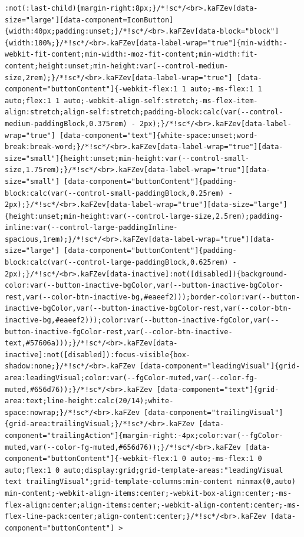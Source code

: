 \documentclass[
  letterpaper,
]{book}
\begin{document}
\begin{verbatim}
:not(:last-child){margin-right:8px;}/*!sc*/<br>.kaFZev[data-size="large"][data-component=IconButton]{width:40px;padding:unset;}/*!sc*/<br>.kaFZev[data-block="block"]{width:100%;}/*!sc*/<br>.kaFZev[data-label-wrap="true"]{min-width:-webkit-fit-content;min-width:-moz-fit-content;min-width:fit-content;height:unset;min-height:var(--control-medium-size,2rem);}/*!sc*/<br>.kaFZev[data-label-wrap="true"] [data-component="buttonContent"]{-webkit-flex:1 1 auto;-ms-flex:1 1 auto;flex:1 1 auto;-webkit-align-self:stretch;-ms-flex-item-align:stretch;align-self:stretch;padding-block:calc(var(--control-medium-paddingBlock,0.375rem) - 2px);}/*!sc*/<br>.kaFZev[data-label-wrap="true"] [data-component="text"]{white-space:unset;word-break:break-word;}/*!sc*/<br>.kaFZev[data-label-wrap="true"][data-size="small"]{height:unset;min-height:var(--control-small-size,1.75rem);}/*!sc*/<br>.kaFZev[data-label-wrap="true"][data-size="small"] [data-component="buttonContent"]{padding-block:calc(var(--control-small-paddingBlock,0.25rem) - 2px);}/*!sc*/<br>.kaFZev[data-label-wrap="true"][data-size="large"]{height:unset;min-height:var(--control-large-size,2.5rem);padding-inline:var(--control-large-paddingInline-spacious,1rem);}/*!sc*/<br>.kaFZev[data-label-wrap="true"][data-size="large"] [data-component="buttonContent"]{padding-block:calc(var(--control-large-paddingBlock,0.625rem) - 2px);}/*!sc*/<br>.kaFZev[data-inactive]:not([disabled]){background-color:var(--button-inactive-bgColor,var(--button-inactive-bgColor-rest,var(--color-btn-inactive-bg,#eaeef2)));border-color:var(--button-inactive-bgColor,var(--button-inactive-bgColor-rest,var(--color-btn-inactive-bg,#eaeef2)));color:var(--button-inactive-fgColor,var(--button-inactive-fgColor-rest,var(--color-btn-inactive-text,#57606a)));}/*!sc*/<br>.kaFZev[data-inactive]:not([disabled]):focus-visible{box-shadow:none;}/*!sc*/<br>.kaFZev [data-component="leadingVisual"]{grid-area:leadingVisual;color:var(--fgColor-muted,var(--color-fg-muted,#656d76));}/*!sc*/<br>.kaFZev [data-component="text"]{grid-area:text;line-height:calc(20/14);white-space:nowrap;}/*!sc*/<br>.kaFZev [data-component="trailingVisual"]{grid-area:trailingVisual;}/*!sc*/<br>.kaFZev [data-component="trailingAction"]{margin-right:-4px;color:var(--fgColor-muted,var(--color-fg-muted,#656d76));}/*!sc*/<br>.kaFZev [data-component="buttonContent"]{-webkit-flex:1 0 auto;-ms-flex:1 0 auto;flex:1 0 auto;display:grid;grid-template-areas:"leadingVisual text trailingVisual";grid-template-columns:min-content minmax(0,auto) min-content;-webkit-align-items:center;-webkit-box-align:center;-ms-flex-align:center;align-items:center;-webkit-align-content:center;-ms-flex-line-pack:center;align-content:center;}/*!sc*/<br>.kaFZev [data-component="buttonContent"] > 
\end{verbatim}
\end{document}
